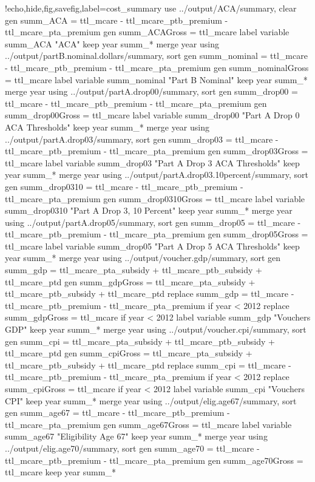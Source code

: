 \documentclass{article}
\begin{document}
\begin{Statacode}{!echo,hide,fig,savefig,label=cost_summary}
use ../output/ACA/summary, clear
gen summ_ACA = ttl_mcare - ttl_mcare_ptb_premium - ttl_mcare_pta_premium
gen summ_ACAGross = ttl_mcare
label variable summ_ACA "ACA"
keep year summ_*
merge year using ../output/partB.nominal.dollars/summary, sort
gen summ_nominal = ttl_mcare - ttl_mcare_ptb_premium - ttl_mcare_pta_premium
gen summ_nominalGross = ttl_mcare
label variable summ_nominal "Part B Nominal"
keep year summ_*
merge year using ../output/partA.drop00/summary, sort
gen summ_drop00 = ttl_mcare - ttl_mcare_ptb_premium - ttl_mcare_pta_premium
gen summ_drop00Gross = ttl_mcare
label variable summ_drop00 "Part A Drop 0 ACA Thresholds"
keep year summ_*
merge year using ../output/partA.drop03/summary, sort
gen summ_drop03 = ttl_mcare - ttl_mcare_ptb_premium - ttl_mcare_pta_premium
gen summ_drop03Gross = ttl_mcare
label variable summ_drop03 "Part A Drop 3 ACA Thresholds"
keep year summ_*
merge year using ../output/partA.drop03.10percent/summary, sort
gen summ_drop0310 = ttl_mcare - ttl_mcare_ptb_premium - ttl_mcare_pta_premium
gen summ_drop0310Gross = ttl_mcare
label variable summ_drop0310 "Part A Drop 3, 10 Percent"
keep year summ_*
merge year using ../output/partA.drop05/summary, sort
gen summ_drop05 = ttl_mcare - ttl_mcare_ptb_premium - ttl_mcare_pta_premium
gen summ_drop05Gross = ttl_mcare
label variable summ_drop05 "Part A Drop 5 ACA Thresholds"
keep year summ_*
merge year using ../output/voucher.gdp/summary, sort
gen summ_gdp = ttl_mcare_pta_subsidy + ttl_mcare_ptb_subsidy + ttl_mcare_ptd
gen summ_gdpGross = ttl_mcare_pta_subsidy + ttl_mcare_ptb_subsidy + ttl_mcare_ptd
replace summ_gdp = ttl_mcare - ttl_mcare_ptb_premium - ttl_mcare_pta_premium if year < 2012
replace summ_gdpGross = ttl_mcare if year < 2012
label variable summ_gdp "Vouchers GDP"
keep year summ_*
merge year using ../output/voucher.cpi/summary, sort
gen summ_cpi = ttl_mcare_pta_subsidy + ttl_mcare_ptb_subsidy + ttl_mcare_ptd
gen summ_cpiGross = ttl_mcare_pta_subsidy + ttl_mcare_ptb_subsidy + ttl_mcare_ptd
replace summ_cpi = ttl_mcare - ttl_mcare_ptb_premium - ttl_mcare_pta_premium if year < 2012
replace summ_cpiGross = ttl_mcare if year < 2012
label variable summ_cpi "Vouchers CPI"
keep year summ_*
merge year using ../output/elig.age67/summary, sort
gen summ_age67 = ttl_mcare - ttl_mcare_ptb_premium - ttl_mcare_pta_premium
gen summ_age67Gross = ttl_mcare
label variable summ_age67 "Eligibility Age 67"
keep year summ_*
merge year using ../output/elig.age70/summary, sort
gen summ_age70 = ttl_mcare - ttl_mcare_ptb_premium - ttl_mcare_pta_premium
gen summ_age70Gross = ttl_mcare
keep year summ_*


\end{Statacode}
\end{document}
